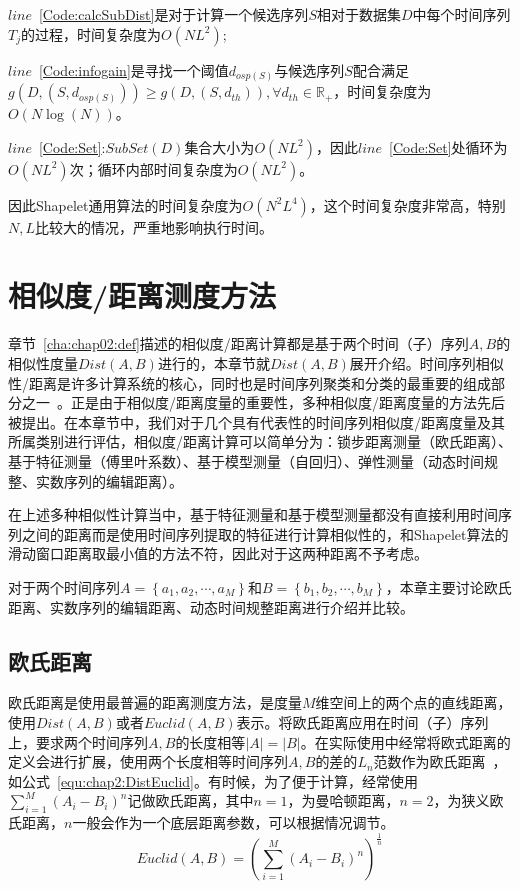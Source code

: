 $line$~\ref{Code:calcSubDist}是对于计算一个候选序列$S$相对于数据集$D$中每个时间序列$T_j$的过程，时间复杂度为$O(NL^2)$;

$line$~\ref{Code:infogain}是寻找一个阈值$d_{osp(S)}$与候选序列$S$配合满足$g(D,(S,d_{osp(S)})) \geq g(D,(S,d_{th})),\forall d_{th}\in \mathbb{R}_{+}$，时间复杂度为$O(N\log(N))$。

$line$~\ref{Code:Set}:$SubSet(D)$集合大小为$O(NL^2)$，因此$line$~\ref{Code:Set}处循环为$O(NL^2)$次；循环内部时间复杂度为$O(NL^2)$。

因此Shapelet通用算法的时间复杂度为$O(N^2L^4)$，这个时间复杂度非常高，特别$N,L$比较大的情况，严重地影响执行时间。

\section{相似度/距离测度方法}
\label{cha:chap02:Distance}

章节~\ref{cha:chap02:def}描述的相似度/距离计算都是基于两个时间（子）序列$A,B$的相似性度量$Dist(A,B)$进行的，本章节就$Dist(A,B)$展开介绍。时间序列相似性/距离是许多计算系统的核心，同时也是时间序列聚类和分类的最重要的组成部分之一~\cite{patidar2012analysis}。正是由于相似度/距离度量的重要性，多种相似度/距离度量的方法先后被提出。在本章节中，我们对于几个具有代表性的时间序列相似度/距离度量及其所属类别进行评估，相似度/距离计算可以简单分为\cite{ding2008querying}：锁步距离测量（欧氏距离）、基于特征测量（傅里叶系数）、基于模型测量（自回归）、弹性测量（动态时间规整、实数序列的编辑距离）。

在上述多种相似性计算当中，基于特征测量和基于模型测量都没有直接利用时间序列之间的距离而是使用时间序列提取的特征进行计算相似性的，和Shapelet算法的滑动窗口距离取最小值的方法不符，因此对于这两种距离不予考虑。

对于两个时间序列$A=\left\lbrace a_1,a_2,\cdots,a_M\right\rbrace$和$B=\left\lbrace b_1,b_2,\cdots,b_M\right\rbrace$，本章主要讨论欧氏距离、实数序列的编辑距离、动态时间规整距离进行介绍并比较。

\subsection{欧氏距离}
欧氏距离是使用最普遍的距离测度方法，是度量$M$维空间上的两个点的直线距离，使用$Dist(A,B)$或者$Euclid(A,B)$表示。将欧氏距离应用在时间（子）序列上，要求两个时间序列$A,B$的长度相等$|A|=|B|$。在实际使用中经常将欧式距离的定义会进行扩展，使用两个长度相等时间序列$A,B$的差的$L_n$范数作为欧氏距离~\cite{serra2014empirical}，如公式~\ref{equ:chap2:DistEuclid}。有时候，为了便于计算，经常使用$\sum_{i=1}^{M}(A_i-B_i)^n$记做欧氏距离，其中$n=1$，为曼哈顿距离，$n=2$，为狭义欧氏距离，$n$一般会作为一个底层距离参数，可以根据情况调节。
\begin{equation}
\label{equ:chap2:DistEuclid}
Euclid(A,B) = (\sum_{i=1}^{M}(A_i-B_i)^n)^{\frac{1}{n}}
\end{equation}

